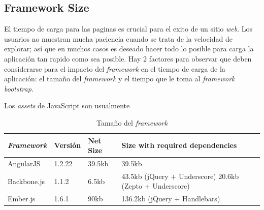 

\subsection{Framework Size}

El tiempo de carga para las paginas es crucial para el exito de un sitio \textit{web}. Los usuarios no muestran mucha paciencia cuando se trata de la velocidad de explorar; así que en muchos casos es deseado hacer todo lo posible para carga la aplicación tan rapido como sea posible. Hay 2 factores para observar que deben considerarse para el impacto del \textit{framework} en el tiempo de carga de la aplicación: el tamaño del \textit{framework} y el tiempo que le toma al \textit{framework} \textit{bootstrap}.

Los \textit{assets} de JavaScript son usualmente 

\begin{table}[h!]
    \tiny
\begin{tabular}{ |L{0.1\paperwidth}|L{0.2\paperwidth}|L{0.2\paperwidth}|L{0.2\paperwidth}|}
\hline
	\textit{Framework}&
	Versión &
	Net Size &
	Size with required dependencies
	
\\ \hline
	AngularJS&
	1.2.22&
	39.5kb&
	39.5kb
\\ \hline
	Backbone.js&
	1.1.2&
	6.5kb&
	43.5kb (jQuery + Underscore) 20.6kb (Zepto + Underscore)
	
\\ \hline
	Ember.js&
	1.6.1&
	90kb&
	136.2kb (jQuery + Handlebars)
	
\\ \hline
\end{tabular}
    \caption{ Tamaño del \textit{framework}}
    \label{tab:framework_size}
\end{table}


